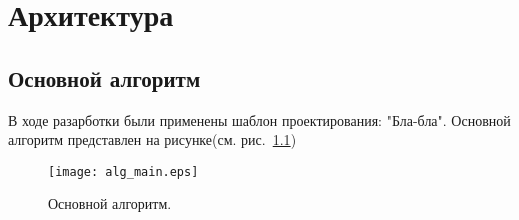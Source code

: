
\chapter{Архитектура}

\section{Основной алгоритм}
В ходе разарботки были применены шаблон проектирования: "Бла-бла". Основной алгоритм представлен на рисунке(см. рис.~\ref{ris:alg_main})

\begin{figure}[h]
\texttt{[image: alg\_main.eps]}
\caption{Основной алгоритм.}
\label{ris:alg_main}
\end{figure}